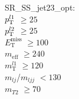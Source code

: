 SR\_SS\_jet23\_opt: \\
$p_{\text{T}}^{l1}$ $\geq 25$ \\
$p_{\text{T}}^{l2}$ $\geq 25$ \\
$E_{\text{T}}^{\text{miss}}$ $\geq 100$ \\
$m_{\text{eff}}$ $\geq 240$ \\
$m_{\text{T}}^{l1}$ $\geq 120$ \\
$m_{lj}$/$m_{ljj}$ $<130$ \\
$m_{T2}$ $\geq 70$ \\
